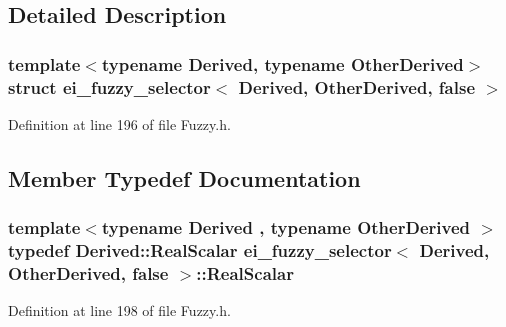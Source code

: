 \subsection{Detailed Description}
\subsubsection*{template$<$typename Derived, typename Other\-Derived$>$struct ei\-\_\-fuzzy\-\_\-selector$<$ Derived, Other\-Derived, false $>$}



Definition at line 196 of file Fuzzy.\-h.



\subsection{Member Typedef Documentation}
\hypertarget{structei__fuzzy__selector_3_01_derived_00_01_other_derived_00_01false_01_4_a077755363cee97ee753bde336016bc04}{
\subsubsection[{Real\-Scalar}]{\setlength{\rightskip}{0pt plus 5cm}template$<$typename Derived , typename Other\-Derived $>$ typedef Derived\-::\-Real\-Scalar {\bf ei\-\_\-fuzzy\-\_\-selector}$<$ Derived, Other\-Derived, false $>$\-::{\bf Real\-Scalar}}}\label{structei__fuzzy__selector_3_01_derived_00_01_other_derived_00_01false_01_4_a077755363cee97ee753bde336016bc04}


Definition at line 198 of file Fuzzy.\-h.



